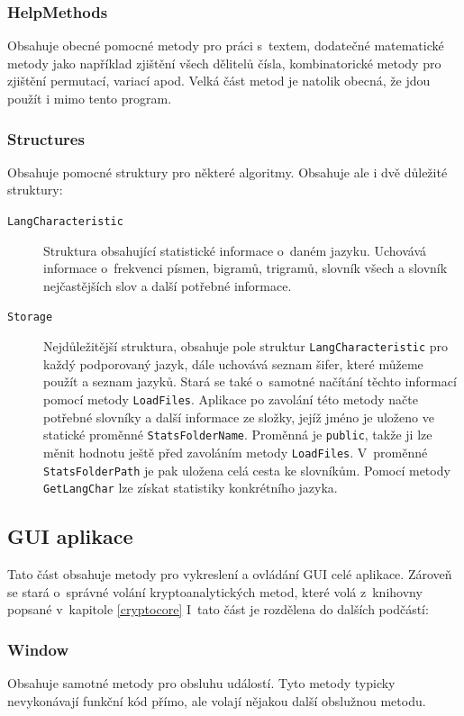 \documentclass[12pt]{article}
\theoremstyle{definition}
\newcommand{\code}[1]{\texttt{#1}}
\begin{document}
\subsubsection{HelpMethods}

Obsahuje obecné pomocné metody pro práci s~textem, dodatečné matematické metody jako například zjištění všech dělitelů čísla, kombinatorické metody pro zjištění permutací, variací apod. Velká část metod je natolik obecná, že jdou použít i mimo tento program. 

\subsubsection{Structures}

Obsahuje pomocné struktury pro některé algoritmy. Obsahuje ale i dvě důležité struktury:

\begin{description}
\item[\code{LangCharacteristic}] Struktura obsahující statistické informace o~daném jazyku. Uchovává informace o~frekvenci písmen, bigramů, trigramů, slovník všech a slovník nejčastějších slov a další potřebné informace. 
\item[\code{Storage}] Nejdůležitější struktura, obsahuje pole struktur \code{LangCharacteristic} pro každý podporovaný jazyk, dále uchovává seznam šifer, které můžeme použít a seznam jazyků. Stará se také o~samotné načítání těchto informací pomocí metody \code{LoadFiles}. Aplikace po zavolání této metody načte potřebné slovníky a další informace ze složky, jejíž jméno je uloženo ve statické proměnné \code{StatsFolderName}. Proměnná je \code{public}, takže ji lze měnit hodnotu ještě před zavoláním metody \code{LoadFiles}. V~proměnné \code{StatsFolderPath} je pak uložena celá cesta ke slovníkům. Pomocí metody \code{GetLangChar} lze získat statistiky konkrétního jazyka.
\end{description}


\subsection{GUI aplikace}
Tato část obsahuje metody pro vykreslení a ovládání GUI celé aplikace. Zároveň se stará o~správné volání kryptoanalytických metod, které volá z~knihovny popsané v~kapitole \ref{cryptocore} I~tato část je rozdělena do dalších podčástí:

\subsubsection{Window}
Obsahuje samotné metody pro obsluhu událostí. Tyto metody typicky nevykonávají funkční kód přímo, ale volají nějakou další obslužnou metodu.
\end{document}
